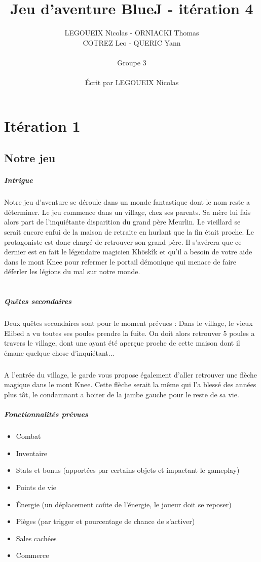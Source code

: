 \documentclass[11pt,a4paper]{report}
\author{LEGOUEIX Nicolas - ORNIACKI Thomas\\ COTREZ Leo - QUERIC Yann\\~\\ Groupe 3\\~\\Écrit par LEGOUEIX Nicolas}
\title{Jeu d'aventure BlueJ - itération 4}
\begin{document}
\maketitle
\tableofcontents
\chapter{Itération 1}
\section{Notre jeu}
\paragraph{Intrigue}
Notre jeu d'aventure se déroule dans un monde fantastique dont le nom reste a déterminer. Le jeu commence dans un village, chez ses parents. Sa mère lui fais alors part de l’inquiétante disparition du grand père Meurlin. Le vieillard se serait encore enfui de la maison de retraite en hurlant que la fin était proche. Le protagoniste est donc chargé de retrouver son grand père. Il s’avérera que ce dernier est en fait le légendaire magicien Khöskîk et qu'il a besoin de votre aide dans le mont Knee pour refermer le portail démonique qui menace de faire déferler les légions du mal sur notre monde.\\~\\
\paragraph{Quêtes secondaires}
Deux quêtes secondaires sont pour le moment prévues : Dans le village, le vieux Elibed a vu toutes ses poules prendre la fuite. On doit alors retrouver 5 poules a travers le village, dont une ayant été aperçue proche de cette maison dont il émane quelque chose d'inquiétant...
\paragraph{}
A l'entrée du village, le garde vous propose également d'aller retrouver une flèche magique dans le mont Knee. Cette flèche serait la même qui l'a blessé des années plus tôt, le condamnant a boiter de la jambe gauche pour le reste de sa vie.
\paragraph{Fonctionnalités prévues}
\begin{itemize}
\item Combat
\item Inventaire
\item Stats et bonus (apportées par certains objets et impactant le gameplay)
\item Points de vie
\item Énergie (un déplacement coûte de l'énergie, le joueur doit se reposer)
\item Pièges (par trigger et pourcentage de chance de s'activer)
\item Sales cachées
\item Commerce
\end{itemize}
\end{document}
